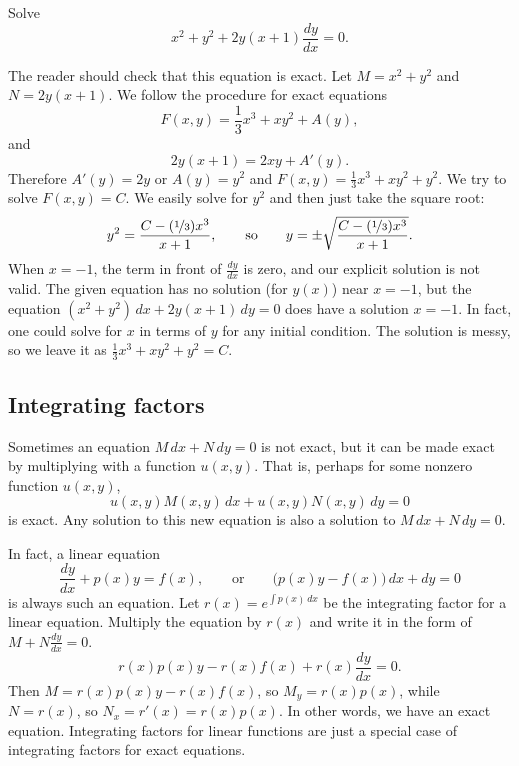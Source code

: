 \begin{example} \label{exact:exampleabove}
Solve
\begin{equation*}
x^2+y^2 + 2y(x+1) \frac{dy}{dx} = 0 .
\end{equation*}

The reader should check that this equation is exact.
Let $M= x^2+y^2$ and $N=2y(x+1)$.
We follow the procedure for exact equations
\begin{equation*}
F(x,y) = \frac{1}{3}x^3 + xy^2 + A(y) ,
\end{equation*}
and
\begin{equation*}
2y(x+1) = 2xy + A'(y) .
\end{equation*}
Therefore $A'(y) = 2y$ or $A(y) = y^2$ and $F(x,y) = \frac{1}{3}x^3 + xy^2 +
y^2$.
We try to solve $F(x,y) = C$.  We easily solve for $y^2$ and then just take
the square root:
\begin{equation*}
y^2 = \frac{C-(\nicefrac{1}{3})x^3}{x+1},
\qquad \text{so} \qquad
y = \pm \sqrt{\frac{C-(\nicefrac{1}{3})x^3}{x+1}} .
\end{equation*}
When $x=-1$, the term in front of $\frac{dy}{dx}$ is zero,
and our explicit solution is not valid.
The given equation has no solution (for $y(x)$) near $x=-1$, but
the equation $(x^2+y^2) \, dx + 2y(x+1) \, dy = 0$ does have
a solution $x=-1$.  In fact, one could solve for $x$ in terms
of $y$ for any initial condition.  The solution is messy,
so we leave it as $\frac{1}{3}x^3 + xy^2 + y^2 = C$.
\end{example}

\subsection{Integrating factors}

Sometimes an equation $M\, dx + N \, dy = 0$ is not exact, but it can be
made exact by multiplying with a function $u(x,y)$.  That is, perhaps
for some nonzero function $u(x,y)$,
\begin{equation*}
u(x,y) M(x,y) \, dx + u(x,y) N(x,y) \, dy = 0
\end{equation*}
is exact.  Any solution to this new equation is also a solution to
$M\, dx + N \, dy = 0$.

In fact, a linear equation
\begin{equation*}
\frac{dy}{dx} + p(x) y = f(x), \qquad
\text{or} \qquad
\bigl( p(x) y - f(x) \bigr)\, dx +  dy  = 0
\end{equation*}
is always such an equation.  Let $r(x) = e^{\int p(x)\,dx}$ be the
integrating factor for a linear equation.  Multiply the equation by $r(x)$
and write it in the form of $M + N \frac{dy}{dx} = 0$.
\begin{equation*}
r(x) p(x) y - r(x) f(x) + r(x) \frac{dy}{dx} = 0 .
\end{equation*}
Then $M = r(x) p(x) y - r(x) f(x)$, so
$M_y = r(x) p(x)$, while $N = r(x)$, so
$N_x = r'(x) = r(x) p(x)$.  In other words, we have an exact equation.
Integrating
factors for linear functions are just a special case of integrating
factors for exact equations.


